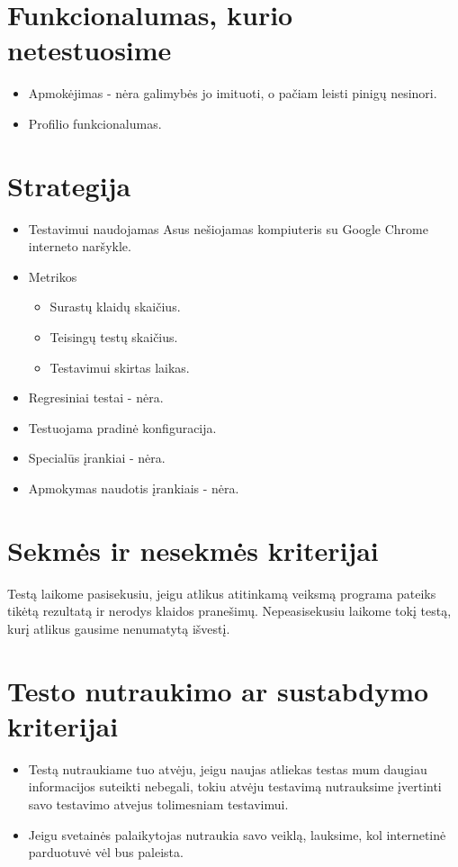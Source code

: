 \documentclass{VUMIFPSkursinis}
\begin{document}
\section{Funkcionalumas, kurio netestuosime}
\begin{itemize}
	\item Apmokėjimas - nėra galimybės jo imituoti, o pačiam leisti pinigų nesinori.
	\item Profilio funkcionalumas.
\end{itemize}
\vspace{1cm}
\section{Strategija}
\begin{itemize}
	\item Testavimui naudojamas Asus nešiojamas kompiuteris su Google Chrome interneto naršykle.
	\item Metrikos
	\begin{itemize}
		\item Surastų klaidų skaičius.
		\item Teisingų testų skaičius.
		\item Testavimui skirtas laikas.
	\end{itemize}
	\item Regresiniai testai - nėra.
	\item Testuojama pradinė konfiguracija.
	\item Specialūs įrankiai - nėra.
	\item Apmokymas naudotis įrankiais - nėra.
\end{itemize}
\vspace{1cm}
\section{Sekmės ir nesekmės kriterijai}
Testą laikome pasisekusiu, jeigu atlikus atitinkamą veiksmą programa pateiks tikėtą rezultatą ir nerodys klaidos pranešimų. Nepeasisekusiu laikome tokį testą, kurį atlikus gausime nenumatytą išvestį.
\vspace{1cm}
\section{Testo nutraukimo ar sustabdymo kriterijai}
\begin{itemize}
	\item Testą nutraukiame tuo atvėju, jeigu naujas atliekas testas mum daugiau informacijos suteikti nebegali, tokiu atvėju testavimą nutrauksime įvertinti savo testavimo atvejus tolimesniam testavimui.
	\item Jeigu svetainės palaikytojas nutraukia savo veiklą, lauksime, kol internetinė parduotuvė vėl bus paleista.
\end{itemize}
\end{document}
